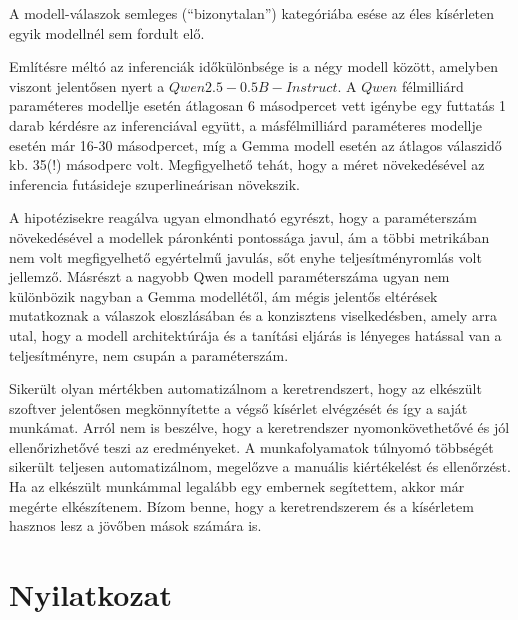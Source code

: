 \documentclass[12pt]{report}
\begin{document}
A modell-válaszok semleges (``bizonytalan'') kategóriába esése az éles kísérleten egyik modellnél sem 
fordult elő.

Említésre méltó az inferenciák időkülönbsége is a négy modell között, amelyben viszont jelentősen nyert a $Qwen2.5-0.5B-Instruct$. A $Qwen$ félmilliárd paraméteres modellje esetén átlagosan 6 másodpercet vett igénybe egy futtatás 1 darab kérdésre az inferenciával együtt, a másfélmilliárd paraméteres modellje esetén már 16-30 másodpercet, míg a Gemma modell esetén az átlagos válaszidő kb. 35(!) másodperc volt. Megfigyelhető tehát, hogy a méret növekedésével az inferencia futásideje szuperlineárisan növekszik.

A hipotézisekre reagálva ugyan elmondható egyrészt, hogy a paraméterszám növekedésével a modellek páronkénti pontossága javul, ám a többi metrikában nem volt megfigyelhető egyértelmű javulás, sőt enyhe teljesítményromlás volt jellemző. 
Másrészt a nagyobb Qwen modell paraméterszáma ugyan nem különbözik nagyban a Gemma modellétől, ám mégis jelentős eltérések mutatkoznak a válaszok eloszlásában és a konzisztens viselkedésben, amely arra utal, hogy a modell architektúrája és a tanítási eljárás is lényeges hatással van a teljesítményre, nem csupán a paraméterszám.

Sikerült olyan mértékben automatizálnom a keretrendszert, hogy az elkészült szoftver jelentősen megkönnyítette a végső kísérlet elvégzését és így a saját munkámat. Arról nem is beszélve, hogy a keretrendszer nyomonkövethetővé és jól ellenőrizhetővé teszi az eredményeket. A munkafolyamatok túlnyomó többségét sikerült teljesen automatizálnom, megelőzve a manuális kiértékelést és ellenőrzést.
Ha az elkészült munkámmal legalább egy embernek segítettem, akkor már megérte elkészítenem. Bízom benne, hogy a keretrendszerem és a kísérletem hasznos lesz a jövőben mások számára is.



% 

    \printbibliography[title={Irodalomjegyzék}]

% 


    \chapter*{Nyilatkozat}
\end{document}
